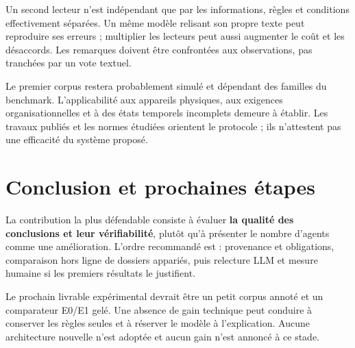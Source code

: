 \documentclass[11pt,a4paper]{article}
\begin{document}
Un second lecteur n'est indépendant que par les informations, règles et
conditions effectivement séparées. Un même modèle relisant son propre texte
peut reproduire ses erreurs ; multiplier les lecteurs peut aussi augmenter
le coût et les désaccords. Les remarques doivent être confrontées aux
observations, pas tranchées par un vote textuel.

Le premier corpus restera probablement simulé et dépendant des familles du
benchmark. L'applicabilité aux appareils physiques, aux exigences
organisationnelles et à des états temporels incomplets demeure à établir.
Les travaux publiés et les normes étudiées orientent le protocole ; ils
n'attestent pas une efficacité du système proposé.

\section{Conclusion et prochaines étapes}
La contribution la plus défendable consiste à évaluer \textbf{la qualité des
conclusions et leur vérifiabilité}, plutôt qu'à présenter le nombre d'agents
comme une amélioration. L'ordre recommandé est : provenance et obligations,
comparaison hors ligne de dossiers appariés, puis relecture LLM et mesure
humaine si les premiers résultats le justifient.

Le prochain livrable expérimental devrait être un petit corpus annoté et un
comparateur E0/E1 gelé. Une absence de gain technique peut conduire à conserver
les règles seules et à réserver le modèle à l'explication. Aucune architecture
nouvelle n'est adoptée et aucun gain n'est annoncé à ce stade.
\end{document}
